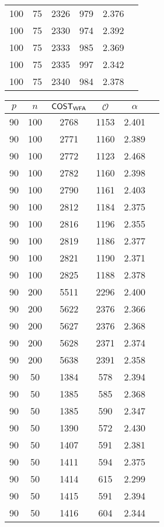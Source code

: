 \begin{table}[!ht]
{\begin{tabular}{|c|c|c|c|c|c|}
100 & 75  & 2326 & 979	& 2.376      \\
100 & 75  & 2330 & 974	& 2.392      \\
100 & 75  & 2333 & 985	& 2.369      \\
100 & 75  & 2335 & 997	& 2.342      \\
100 & 75  & 2340 & 984	& 2.378      \\
\hline
\end{tabular}
}
\hfill
\parbox{.45\linewidth}{
\centering
\begin{tabular}{|c|c|c|c|c|c|}
\hline
$p$ & $n$ & $\sf{COST}_{\sf{WFA}}$ & $\mathcal{O}$ & $\alpha$ \\
\hline
90  & 100  & 2768       & 1153	& 2.401 \\
90  & 100  & 2771       & 1160	& 2.389 \\
90  & 100  & 2772       & 1123	& 2.468 \\
90  & 100  & 2782       & 1160	& 2.398 \\
90  & 100  & 2790       & 1161	& 2.403 \\
90  & 100  & 2812       & 1184	& 2.375 \\
90  & 100  & 2816       & 1196	& 2.355 \\
90  & 100  & 2819       & 1186	& 2.377 \\
90  & 100  & 2821       & 1190	& 2.371 \\
90  & 100  & 2825       & 1188	& 2.378 \\
90  & 200  & 5511       & 2296	& 2.400 \\
90  & 200  & 5622       & 2376	& 2.366 \\
90  & 200  & 5627       & 2376	& 2.368 \\
90  & 200  & 5628       & 2371	& 2.374 \\
90  & 200  & 5638       & 2391	& 2.358 \\
90  & 50   & 1384       & 578	& 2.394  \\
90  & 50   & 1385       & 585	& 2.368  \\
90  & 50   & 1385       & 590	& 2.347  \\
90  & 50   & 1390       & 572	& 2.430  \\
90  & 50   & 1407       & 591	& 2.381  \\
90  & 50   & 1411       & 594	& 2.375  \\
90  & 50   & 1414       & 615	& 2.299  \\
90  & 50   & 1415       & 591	& 2.394  \\
90  & 50   & 1416       & 604	& 2.344  \\

\end{tabular}}
\end{table}
